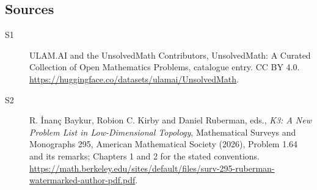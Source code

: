 \documentclass[11pt]{article}
\begin{document}
\subsection{Sources}
\begin{description}
\item[\hypertarget{source:statement:1}{S1}] ULAM.AI and the UnsolvedMath Contributors, UnsolvedMath: A Curated Collection of Open Mathematics Problems, catalogue entry. CC BY 4.0. \url{https://huggingface.co/datasets/ulamai/UnsolvedMath}.
\item[\hypertarget{source:statement:2}{S2}] R. İnanç Baykur, Robion C. Kirby and Daniel Ruberman, eds., \emph{K3: A New Problem List in Low-Dimensional Topology}, Mathematical Surveys and Monographs 295, American Mathematical Society (2026), Problem 1.64 and its remarks; Chapters 1 and 2 for the stated conventions. \url{https://math.berkeley.edu/sites/default/files/surv-295-ruberman-watermarked-author-pdf.pdf}.
\end{description}
\label{end:statement}
\end{document}
